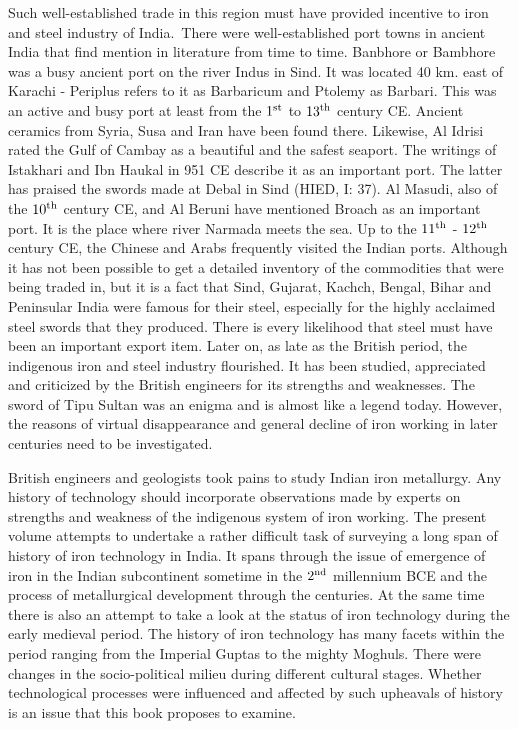 Such well-established trade in this region must have provided incentive to iron and steel industry of India.~There were well-established port towns in ancient India that find mention in literature from time to time. Banbhore or Bambhore was a busy ancient port on the river Indus in Sind. It was located 40 km. east of Karachi - Periplus refers to it as Barbaricum and Ptolemy as Barbari. This was an active and busy port at least from the $1^{\rm st}$ to $13^{\rm th}$ century CE. Ancient ceramics from Syria, Susa and Iran have been found there. Likewise, Al Idrisi rated the Gulf of Cambay as a beautiful and the safest seaport. The writings of Istakhari and Ibn Haukal in 951 CE describe it as an important port. The latter has praised the swords made at Debal in Sind (HIED, I: 37). Al Masudi, also of the $10^{\rm th}$ century CE, and Al Beruni have mentioned Broach as an important port. It is the place where river Narmada meets the sea. Up to the $11^{\rm th}$ - $12^{\rm th}$ century CE, the Chinese and Arabs frequently visited the Indian ports. Although it has not been possible to get a detailed inventory of the commodities that were being traded in, but it is a fact that Sind, Gujarat, Kachch, Bengal, Bihar and Peninsular India were famous for their steel, especially for the highly acclaimed steel swords that they produced. There is every likelihood that steel must have been an important export item. Later on, as late as the British period, the indigenous iron and steel industry flourished. It has been studied, appreciated and criticized by the British engineers for its strengths and weaknesses. The sword of Tipu Sultan was an enigma and is almost like a legend today. However, the reasons of virtual disappearance and general decline of iron working in later centuries need to be investigated. 

British engineers and geologists took pains to study Indian iron metallurgy. Any history of technology should incorporate observations made by experts on strengths and weakness of the indigenous system of iron working. The present volume attempts to undertake a rather difficult task of surveying a long span of history of iron technology in India. It spans through the issue of emergence of iron in the Indian subcontinent sometime in the $2^{\rm nd}$ millennium BCE and the process of metallurgical development through the centuries. At the same time there is also an attempt to take a look at the status of iron technology during the early medieval period. The history of iron technology has many facets within the period ranging from the Imperial Guptas to the mighty Moghuls. There were changes in the socio-political milieu during different cultural stages. Whether technological processes were influenced and affected by such upheavals of history is an issue that this book proposes to examine. 

